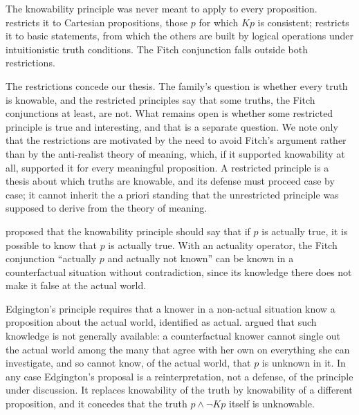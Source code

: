 \documentclass{situationist-preprint}
\begin{document}
\begin{objection}[Restriction]
The knowability principle was never meant to apply to every proposition. \citet{Tennant1997} restricts it to Cartesian propositions, those $p$ for which $Kp$ is consistent; \citet{Dummett2001} restricts it to basic statements, from which the others are built by logical operations under intuitionistic truth conditions. The Fitch conjunction falls outside both restrictions.
\end{objection}

\begin{reply}
The restrictions concede our thesis. The family's question is whether every truth is knowable, and the restricted principles say that some truths, the Fitch conjunctions at least, are not. What remains open is whether some restricted principle is true and interesting, and that is a separate question. We note only that the restrictions are motivated by the need to avoid Fitch's argument rather than by the anti-realist theory of meaning, which, if it supported knowability at all, supported it for every meaningful proposition. A restricted principle is a thesis about which truths are knowable, and its defense must proceed case by case; it cannot inherit the a priori standing that the unrestricted principle was supposed to derive from the theory of meaning.
\end{reply}

\begin{objection}
\citet{Edgington1985} proposed that the knowability principle should say that if $p$ is actually true, it is possible to know that $p$ is actually true. With an actuality operator, the Fitch conjunction \enquote{actually $p$ and actually not known} can be known in a counterfactual situation without contradiction, since its knowledge there does not make it false at the actual world.
\end{objection}

\begin{reply}
Edgington's principle requires that a knower in a non-actual situation know a proposition about the actual world, identified as actual. \citet{Williamson2000} argued that such knowledge is not generally available: a counterfactual knower cannot single out the actual world among the many that agree with her own on everything she can investigate, and so cannot know, of the actual world, that $p$ is unknown in it. In any case Edgington's proposal is a reinterpretation, not a defense, of the principle under discussion. It replaces knowability of the truth by knowability of a different proposition, and it concedes that the truth $p \wedge \neg Kp$ itself is unknowable.
\end{reply}
\end{document}
